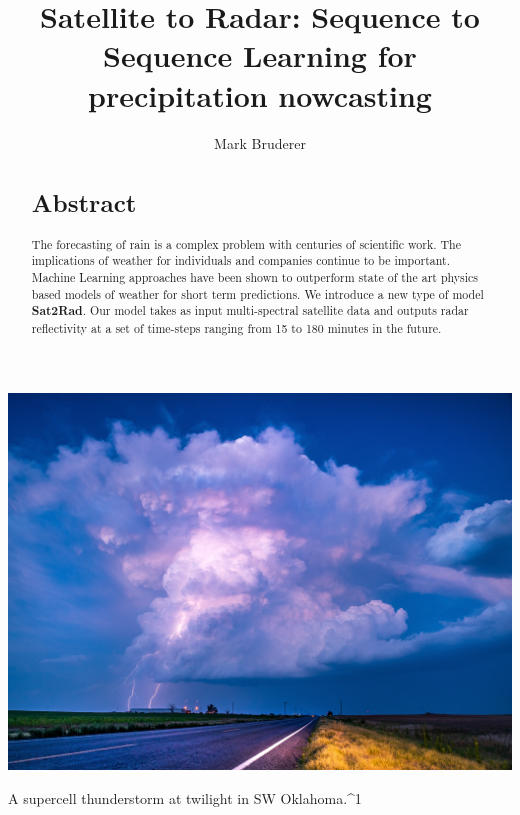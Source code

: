 \documentclass[acmtog, authorversion]{acmart}
\begin{document}
\title{Satellite to Radar: Sequence to Sequence Learning for precipitation nowcasting}

\author{Mark Bruderer}

\renewcommand{\shortauthors}{Mark Bruderer}

\begin{abstract}
\section*{Abstract}
The forecasting of rain is a complex problem with centuries of scientific work. The implications of weather for individuals and companies continue to be important. Machine Learning approaches have been shown to outperform state of the art physics based models of weather for short term predictions. We introduce a new type of model \textbf{Sat2Rad}. Our model takes as input multi-spectral satellite data and outputs radar reflectivity at a set of time-steps ranging from 15 to 180 minutes in the future.
\end{abstract}



\begin{teaserfigure}
  \includegraphics*[width=\textwidth, trim= 0in 0.0in 0in 16.0in]{images/lightning.jpg}
  \caption{A supercell thunderstorm at twilight in SW Oklahoma.^1}
  \label{fig:teaser}
\end{teaserfigure}
\end{document}
